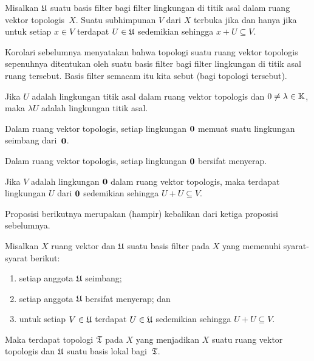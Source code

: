 \begin{cor} Misalkan $\mathfrak{U}$ suatu basis filter bagi filter lingkungan di titik asal dalam ruang vektor topologis~$X$.  Suatu subhimpunan $V$ dari $X$
terbuka jika dan hanya jika untuk setiap $x \in V$ terdapat $U \in \mathfrak{U}$ sedemikian sehingga $x + U \subseteq V$.
\end{cor}

Korolari sebelumnya menyatakan bahwa topologi suatu ruang vektor topologis sepenuhnya ditentukan oleh suatu basis filter bagi
filter lingkungan di titik asal ruang tersebut.  Basis filter semacam itu kita sebut
 (bagi topologi tersebut).

\begin{prop} Jika $U$ adalah lingkungan titik asal dalam ruang vektor topologis dan $0 \ne \lambda \in \mathbb{K}$, maka $\lambda U$ adalah
lingkungan titik asal.
\end{prop}

\begin{prop} Dalam ruang vektor topologis, setiap lingkungan $\mathbf{0}$ memuat suatu lingkungan seimbang dari~$\mathbf{0}$.
\end{prop}

\begin{prop} Dalam ruang vektor topologis, setiap lingkungan $\mathbf{0}$ bersifat menyerap.
\end{prop}

\begin{prop} Jika $V$ adalah lingkungan $\mathbf{0}$ dalam ruang vektor topologis, maka terdapat lingkungan $U$ dari $\mathbf{0}$
sedemikian sehingga $U + U \subseteq V$.
\end{prop}

Proposisi berikutnya merupakan (hampir) kebalikan dari ketiga proposisi sebelumnya.

\begin{prop}\label{prop_fbase_induces_top} Misalkan $X$ ruang vektor dan $\mathfrak{U}$ suatu basis filter pada $X$ yang memenuhi syarat-syarat berikut:
   \begin{enumerate}[label=\rm{(\alph*)}]
     \item setiap anggota $\mathfrak{U}$ seimbang;
     \item setiap anggota $\mathfrak{U}$ bersifat menyerap; dan
     \item untuk setiap $V \in \mathfrak{U}$ terdapat $U \in \mathfrak{U}$ sedemikian sehingga $U + U \subseteq V$.
   \end{enumerate}
Maka terdapat topologi $\mathfrak{T}$ pada $X$ yang menjadikan $X$ suatu ruang vektor topologis dan $\mathfrak{U}$ suatu basis lokal bagi~$\mathfrak{T}$.
\end{prop}

